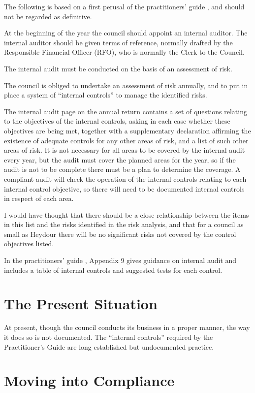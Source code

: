 \documentclass[numreferences]{rbjk}
\begin{document}
\begin{article}
The following is based on a first perusal of the practitioners' guide \cite{JPAG08}, and should not be regarded as definitive.

At the beginning of the year the council should appoint an internal auditor.
The internal auditor should be given terms of reference, normally drafted by the Responsible Financial Officer (RFO), who is normally the Clerk to the Council.

The internal audit must be conducted on the basis of an assessment of risk.

The council is obliged to undertake an assessment of risk annually, and to put in place a system of ``internal controls'' to manage the identified risks.

The internal audit page on the annual return contains a set of questions relating to the objectives of the internal controls, asking in each case whether these objectives are being met, together with a supplementary declaration affirming the existence of adequate controls for any other areas of risk, and a list of such other areas of risk.
It is not necessary for all areas to be covered by the internal audit every year, but the audit must cover the planned areas for the year, so if the audit is not to be complete there must be a plan to determine the coverage.
A compliant audit will check the operation of the internal controls relating to each internal control objective, so there will need to be documented internal controls in respect of each area.

I would have thought that there should be a close relationship between the items in this list and the risks identified in the risk analysis, and that for a council as small as Heydour there will be no significant risks not covered by the control objectives listed.

In the practitioners' guide \cite{JPAG08}, Appendix 9 gives guidance on internal audit and includes a table of internal controls and suggested tests for each control.

\section{The Present Situation}

At present, though the council conducts its business in a proper manner, the way it does so is not documented.
The ``internal controls'' required by the Practitioner's Guide are long established but undocumented practice.

\section{Moving into Compliance}


\end{article}
\end{document}
